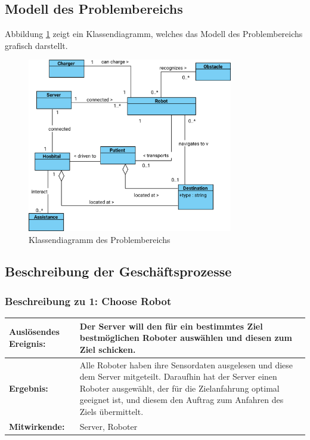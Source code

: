 		\subsection{Modell des Problembereichs}
		Abbildung \ref{fig:2-3-modell-problembereich} zeigt ein Klassendiagramm, welches das Modell des Problembereichs grafisch darstellt.
		\begin{figure}[H]
			\centering
			\includegraphics[width=0.8\textwidth]{img/1-Entwurf-2}
			\caption{Klassendiagramm des Problembereichs}
			\label{fig:2-3-modell-problembereich}
		\end{figure}

		\subsection{Beschreibung der Geschäftsprozesse}

			\subsubsection*{Beschreibung zu 1: Choose Robot}

			\begin{table}[H]
				\centering
				\begin{tabularx}{\textwidth}{|p{3cm}|X|}
				\hline
				\textbf{Auslösendes Ereignis:} & Der Server will den für ein bestimmtes Ziel bestmöglichen Roboter auswählen und diesen zum Ziel schicken. \\ \hline
				\textbf{Ergebnis:} & Alle Roboter haben ihre Sensordaten ausgelesen und diese dem Server
				mitgeteilt. Daraufhin hat der Server einen Roboter ausgewählt, der für
				die Zielanfahrung optimal geeignet ist, und diesem den Auftrag zum
				Anfahren des Ziels übermittelt. \\ \hline
				\textbf{Mitwirkende:} &	Server, Roboter \\
				\hline
				\end{tabularx}
				\label{tab:2-4-choose-robot}
			\end{table}

